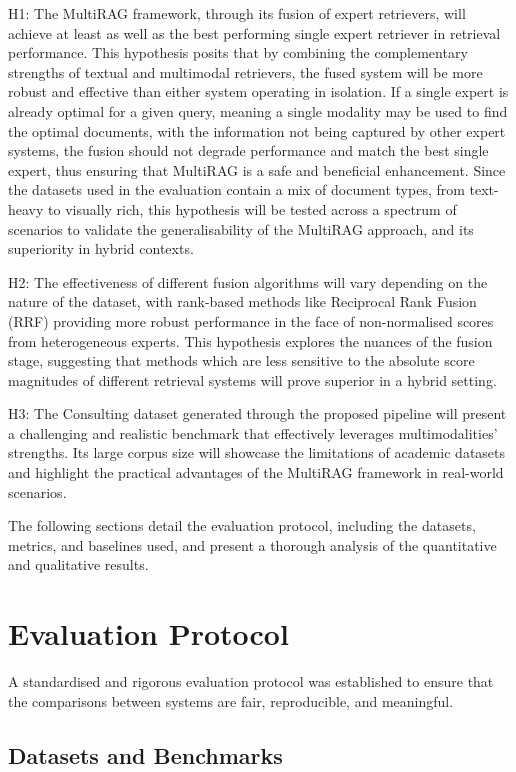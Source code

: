 \documentclass[12pt,twoside]{report}
\begin{document}
H1: The MultiRAG framework, through its fusion of expert retrievers, will achieve at least as well as the best performing single expert retriever in retrieval performance. This hypothesis posits that by combining the complementary strengths of textual and multimodal retrievers, the fused system will be more robust and effective than either system operating in isolation. If a single expert is already optimal for a given query, meaning a single modality may be used to find the optimal documents, with the information not being captured by other expert systems, the fusion should not degrade performance and match the best single expert, thus ensuring that MultiRAG is a safe and beneficial enhancement. Since the datasets used in the evaluation contain a mix of document types, from text-heavy to visually rich, this hypothesis will be tested across a spectrum of scenarios to validate the generalisability of the MultiRAG approach, and its superiority in hybrid contexts.

H2: The effectiveness of different fusion algorithms will vary depending on the nature of the dataset, with rank-based methods like Reciprocal Rank Fusion (RRF) providing more robust performance in the face of non-normalised scores from heterogeneous experts. This hypothesis explores the nuances of the fusion stage, suggesting that methods which are less sensitive to the absolute score magnitudes of different retrieval systems will prove superior in a hybrid setting.

H3: The Consulting dataset generated through the proposed pipeline will present a challenging and realistic benchmark that effectively leverages multimodalities' strengths. Its large corpus size will showcase the limitations of academic datasets and highlight the practical advantages of the MultiRAG framework in real-world scenarios.

The following sections detail the evaluation protocol, including the datasets, metrics, and baselines used, and present a thorough analysis of the quantitative and qualitative results.

\section{Evaluation Protocol}

A standardised and rigorous evaluation protocol was established to ensure that the comparisons between systems are fair, reproducible, and meaningful.

\subsection{Datasets and Benchmarks}
\end{document}
